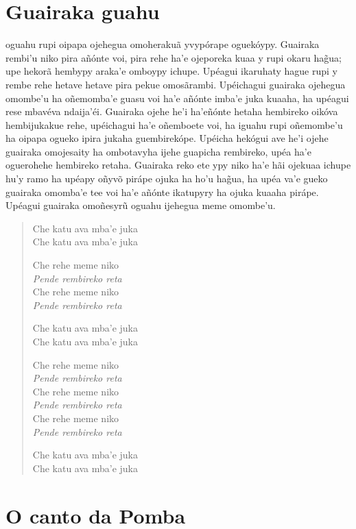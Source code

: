 \chapter{Guairaka guahu}

 oguahu rupi oipapa ojehegua omoherakuã yvypórape oguekóypy.
Guairaka rembi'u niko pira añónte voi, pira rehe ha'e ojeporeka kuaa y
rupi okaru hag̃ua; upe hekorã hembypy araka'e omboypy ichupe. Upéagui
ikaruhaty hague rupi y rembe rehe hetave hetave pira pekue omosãrambi.
Upéichagui guairaka ojehegua omombe'u ha oñemomba'e guasu voi ha'e
añónte imba'e juka kuaaha, ha upéagui rese mbavéva ndaija'éi. Guairaka
ojehe he'i ha'eñónte hetaha hembireko oikóva hembijukakue rehe,
upéichagui ha'e oñemboete voi, ha iguahu rupi oñemombe'u ha oipapa
ogueko ipira jukaha guembirekópe. Upéicha hekógui ave he'i ojehe
guairaka omojesaity ha ombotavyha ijehe guapicha rembireko, upéa ha'e
oguerohehe hembireko retaha. Guairaka reko ete ypy niko ha'e hãi ojekuaa
ichupe hu'y ramo ha upéapy oñyvõ pirápe ojuka ha ho'u hag̃ua, ha upéa
va'e gueko guairaka omomba'e tee voi ha'e añónte ikatupyry ha ojuka
kuaaha pirápe. Upéagui guairaka omoñesyrũ oguahu ijehegua meme omombe'u.

\begin{verse}
Che katu ava mba'e juka\\
Che katu ava mba'e juka
       
Che rehe meme niko\\
\textit{Pende rembireko reta}\\
Che rehe meme niko\\
\textit{Pende rembireko reta}
       
Che katu ava mba'e juka\\
Che katu ava mba'e juka          
       
Che rehe meme niko\\
\textit{Pende rembireko reta}\\
Che rehe meme niko\\
\textit{Pende rembireko reta}\\
Che rehe meme niko\\
\textit{Pende rembireko reta}
       
Che katu ava mba'e juka\\
Che katu ava mba'e juka
\end{verse}

\chapter{O canto da Pomba}

